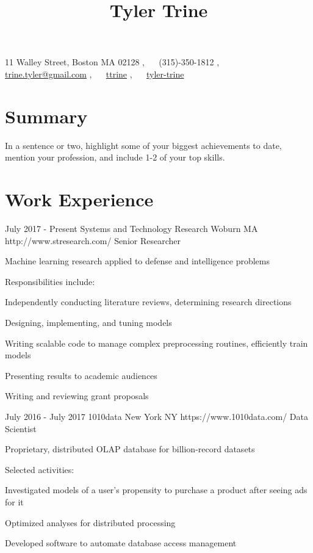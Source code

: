 \documentclass[10pt]{article}
\begin{document}
\title{Tyler Trine}
11 Walley Street, Boston MA 02128 \sep
{~{\faMobile}~}  (315)-350-1812 \sep
{~{\footnotesize\faEnvelopeO}~} \href{mailto:trine.tyler@gmail.com}{trine.tyler@gmail.com} \sep
{~\faGithub~} \href{https://github.com/ttrine}{ttrine} \sep
{~\small\faLinkedin~} \href{https://www.linkedin.com/in/tyler-trine/}{tyler-trine}

\section{Summary} In a sentence or two, highlight some of your biggest achievements to date, mention your profession, and include 1-2 of your top skills.

\section{Work Experience}
	\job %
		{July 2017 - Present}
		{Systems and Technology Research}
		{Woburn MA}
		{http://www.stresearch.com/}
		{Senior Researcher}
		{\begin{itemize-noindent}
			\item Machine learning research applied to defense and intelligence problems
			\item Responsibilities include:
				\begin{subitemize-noindent}
					\item Independently conducting literature reviews, determining research directions
					\item Designing, implementing, and tuning models
					\item Writing scalable code to manage complex preprocessing routines, efficiently train models
					\item Presenting results to academic audiences
					\item Writing and reviewing grant proposals
				\end{subitemize-noindent}
		\end{itemize-noindent}
		}
	\vspace{-15pt} %
	\job %
		{July 2016 - July 2017}
		{1010data}
		{New York NY}
		{https://www.1010data.com/}
		{Data Scientist}
		{\begin{itemize-noindent}
			\vspace{-7pt}
			\item Proprietary, distributed OLAP database for billion-record datasets
			\item Selected activities:
				\begin{subitemize-noindent}
					\item Investigated models of a user's propensity to purchase a product after seeing ads for it
					\item Optimized analyses for distributed processing
					\item Developed software to automate database access management
				\end{subitemize-noindent}
		\end{itemize-noindent}}
\end{document}
